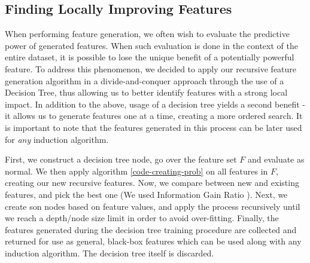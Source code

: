 \documentclass[twoside,11pt]{article}
\theoremstyle{definition}
\begin{document}
\subsection{Finding Locally Improving Features} \label{tree_usage}

When performing feature generation, we often wish to evaluate the predictive power of generated features. When such evaluation is done in the context of the entire dataset, it is possible to lose the unique benefit of a potentially powerful feature. To address this phenomenon, we decided to apply our recursive feature generation algorithm in a divide-and-conquer approach through the use of a Decision Tree, thus allowing us to better identify features with a strong local impact. In addition to the above, usage of a decision tree yields a second benefit - it allows us to generate features one at a time, creating a more ordered search. It is important to note that the features generated in this process can be later used for \emph{any} induction algorithm.

First, we construct a decision tree node, go over the feature set $F$ and evaluate as normal. We then apply algorithm \ref{code-creating-prob} on all features in $F$, creating our new recursive features. Now, we compare between new and existing features, and pick the best one (We used Information Gain Ratio \cite{quinlan1986}).  
Next, we create son nodes based on feature values, and apply the process recursively until we reach a depth/node size limit in order to avoid over-fitting. 
Finally, the features generated during the decision tree training procedure are collected and returned for use as general, black-box features which can be used along with any induction algorithm. The decision tree itself is discarded.
\end{document}
